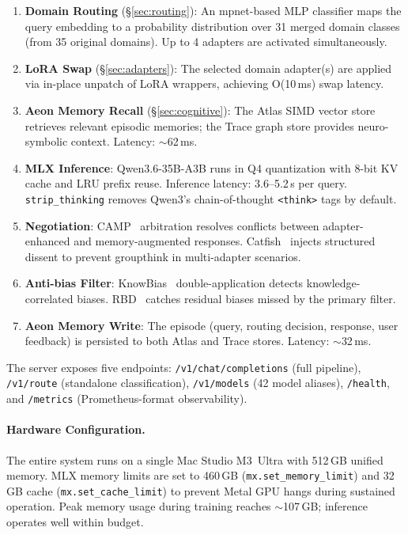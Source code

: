 \documentclass[11pt,a4paper]{article}
\begin{document}
\begin{enumerate}[nosep]
  \item \textbf{Domain Routing} (\S\ref{sec:routing}): An mpnet-based MLP classifier maps the query embedding to a probability distribution over 31 merged domain classes (from 35 original domains). Up to 4 adapters are activated simultaneously.
  \item \textbf{LoRA Swap} (\S\ref{sec:adapters}): The selected domain adapter(s) are applied via in-place unpatch of LoRA wrappers, achieving O(10\,ms) swap latency.
  \item \textbf{Aeon Memory Recall} (\S\ref{sec:cognitive}): The Atlas SIMD vector store retrieves relevant episodic memories; the Trace graph store provides neuro-symbolic context. Latency: $\sim$62\,ms.
  \item \textbf{MLX Inference}: Qwen3.6-35B-A3B runs in Q4 quantization with 8-bit KV cache and LRU prefix reuse. Inference latency: 3.6--5.2\,s per query. \texttt{strip\_thinking} removes Qwen3's chain-of-thought \texttt{<think>} tags by default.
  \item \textbf{Negotiation}: CAMP~\citep{camp2026} arbitration resolves conflicts between adapter-enhanced and memory-augmented responses. Catfish~\citep{catfish2025} injects structured dissent to prevent groupthink in multi-adapter scenarios.
  \item \textbf{Anti-bias Filter}: KnowBias~\citep{knowbias2025} double-application detects knowledge-correlated biases. RBD~\citep{rbd2025} catches residual biases missed by the primary filter.
  \item \textbf{Aeon Memory Write}: The episode (query, routing decision, response, user feedback) is persisted to both Atlas and Trace stores. Latency: $\sim$32\,ms.
\end{enumerate}

The server exposes five endpoints: \texttt{/v1/chat/completions} (full pipeline), \texttt{/v1/route} (standalone classification), \texttt{/v1/models} (42 model aliases), \texttt{/health}, and \texttt{/metrics} (Prometheus-format observability).

\paragraph{Hardware Configuration.}
The entire system runs on a single Mac Studio M3~Ultra with 512\,GB unified memory. MLX memory limits are set to 460\,GB (\texttt{mx.set\_memory\_limit}) and 32\,GB cache (\texttt{mx.set\_cache\_limit}) to prevent Metal GPU hangs during sustained operation. Peak memory usage during training reaches $\sim$107\,GB; inference operates well within budget.
\end{document}
